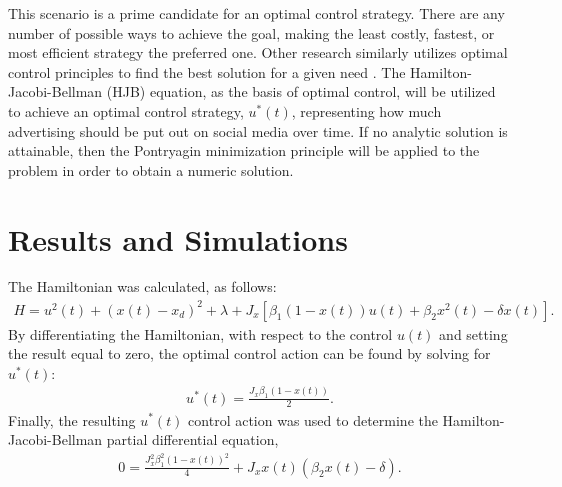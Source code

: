 This scenario is a prime candidate for an optimal control strategy. There are any number of possible ways to achieve the goal, making the least costly, fastest, or most efficient strategy the preferred one. Other research similarly utilizes optimal control principles to find the best solution for a given need \cite{kachroo2017optimal}. The Hamilton-Jacobi-Bellman (HJB) equation, as the basis of optimal control, will be utilized to achieve an optimal control strategy, $u^*(t)$, representing how much advertising should be put out on social media over time. If no analytic solution is attainable, then the Pontryagin minimization principle will be applied to the problem in order to obtain a numeric solution.

\section{Results and Simulations}
The Hamiltonian was calculated, as follows:
\begin{equation}
\left.\begin{aligned}
H = u^2(t) + (x(t)-x_d)^2 + \lambda +J_x[\beta_1(1-x(t))u(t) + \beta_2 x^2(t) - \delta x(t)].
\end{aligned}\right.
\end{equation}
By differentiating the Hamiltonian, with respect to the control $u(t)$ and setting the result equal to zero, the optimal control action can be found by solving for $u^*(t)$:
\begin{equation}
\left.\begin{aligned}
u^*(t) = \frac{J_x \beta_1 (1-x(t))}{2}.
\end{aligned}\right.
\end{equation}
Finally, the resulting $u^*(t)$ control action was used to determine the Hamilton-Jacobi-Bellman partial differential equation,
\begin{equation}
\left.\begin{aligned}
0 = \frac{J_x^2 \beta_1^2 (1-x(t))^2}{4} + J_x x(t)(\beta_2 x(t)-\delta).
\end{aligned}\right.
\end{equation}


